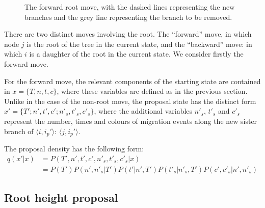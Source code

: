 \documentclass[a4paper,11pt]{article}
\begin{document}
\begin{figure}
\begin{center}
\end{center}
\caption{The forward root move, with the dashed lines representing
the new branches and the grey line representing the branch to be removed.}
\end{figure}

There are two distinct moves involving the root. The ``forward'' move,
in which node $j$ is the root of the tree in the current state, and
the ``backward'' move: in which $i$ is a daughter of the root in the
current state.  We consider firstly the forward move.

For the forward move, the relevant components of the starting state
are contained in $x=\{T,n,t,c\}$, where these variables are defined as
in the previous section.  Unlike in the case of the non-root move, the
proposal state has the distinct form
$x'=\{T';n',t',c';n'_s,t'_s,c'_s\}$, where the additional variables
$n'_s$, $t'_s$ and $c'_s$  represent the number, times and colours
of migration events along the new sister branch of $\langle
i,i_p'\rangle$: $\langle j,i_p'\rangle$.

The proposal density has the following form:
\begin{align}
  q(x'|x)&=P(T',n',t',c',n'_s,t'_s,c'_s|x)\\
&=P(T')P(n',n'_s|T')P(t'|n',T')P(t'_s|n'_s,T')P(c',c'_s|n',n'_s)\nonumber
\end{align}

\subsection{Root height proposal}
\end{document}
